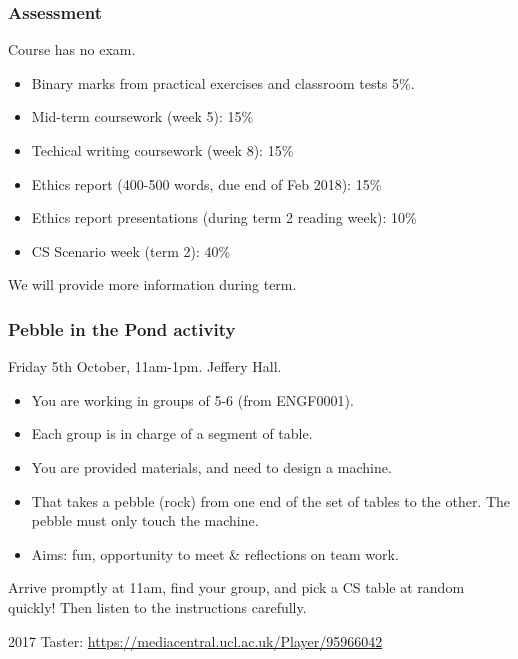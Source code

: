 \documentclass{beamer} %
\begin{document}
\begin{frame}
  \frametitle{Assessment}

  Course has no exam.
  \begin{itemize}
    \item Binary marks from practical exercises and classroom tests 5\%.
    \item Mid-term coursework (week 5): 15\%
    \item Techical writing coursework (week 8): 15\%
    \item Ethics report (400-500 words, due end of Feb 2018): 15\%
    \item Ethics report presentations (during term 2 reading week): 10\%
    \item CS Scenario week (term 2): 40\%
  \end{itemize}

We will provide more information during term.

\end{frame}

\begin{frame}
\frametitle{Pebble in the Pond activity} 

Friday 5th October, 11am-1pm. Jeffery Hall.

\begin{itemize}
	\item You are working in groups of 5-6 (from ENGF0001).
	\item Each group is in charge of a segment of table.
	\item You are provided materials, and need to design a machine.
	\item That takes a pebble (rock) from one end of the set of tables to the other. The pebble must only touch the machine.
	\item Aims: fun, opportunity to meet \& reflections on team work.
\end{itemize}


Arrive promptly at 11am, find your group, and pick a CS table at random quickly! Then listen to the instructions carefully.

\vspace{0.24in}
2017 Taster: \url{https://mediacentral.ucl.ac.uk/Player/95966042}
\end{frame}
\end{document}
